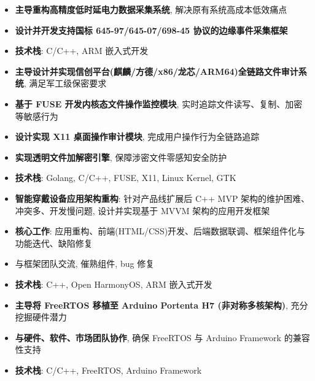 \documentclass{resume}
\begin{document}
\begin{itemize}
  \item \textbf{主导重构高精度低时延电力数据采集系统}, 解决原有系统高成本低效痛点
  \item \textbf{设计并开发支持国标 645-97/645-07/698-45 协议的边缘事件采集框架}
  \item \textbf{技术栈}: C/C++, ARM 嵌入式开发
\end{itemize}

\begin{itemize}
  \item \textbf{主导设计并实现信创平台(麒麟/方德/x86/龙芯/ARM64)全链路文件审计系统}, 满足军工级保密要求
  \item \textbf{基于 FUSE 开发内核态文件操作监控模块}, 实时追踪文件读写、复制、加密等敏感行为
  \item \textbf{设计实现 X11 桌面操作审计模块}, 完成用户操作行为全链路追踪
  \item \textbf{实现透明文件加解密引擎}, 保障涉密文件零感知安全防护
  \item \textbf{技术栈}: Golang, C/C++, FUSE, X11, Linux Kernel, GTK
\end{itemize}

\begin{itemize}
  \item \textbf{智能穿戴设备应用架构重构}: 针对产品线扩展后 C++ MVP 架构的维护困难、冲突多、开发慢问题, 设计并实现基于 MVVM 架构的应用开发框架
  \item \textbf{核心工作}: 应用重构、前端(HTML/CSS)开发、后端数据联调、框架组件化与功能迭代、缺陷修复
  \item 与框架团队交流, 催熟组件, bug 修复
  \item \textbf{技术栈}: C++, Open HarmonyOS, ARM 嵌入式开发
\end{itemize}

\begin{itemize}
  \item \textbf{主导将 FreeRTOS 移植至 Arduino Portenta H7 (非对称多核架构)}, 充分挖掘硬件潜力
  \item \textbf{与硬件、软件、市场团队协作}, 确保 FreeRTOS 与 Arduino Framework 的兼容性支持
  \item \textbf{技术栈}: C/C++, FreeRTOS, Arduino Framework
\end{itemize}
\end{document}
